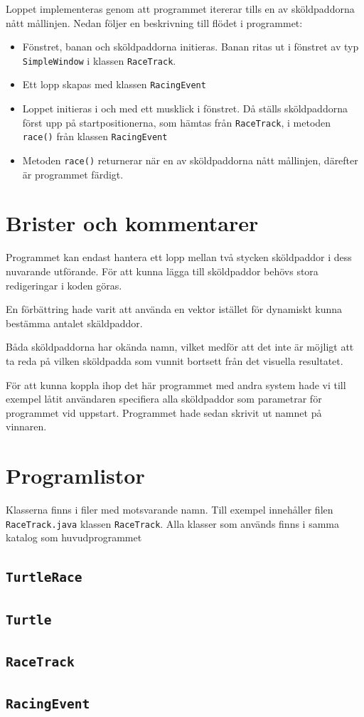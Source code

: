 \documentclass[a4paper]{article}
\newcommand{\code}[1]{\texttt{#1}} %
\begin{document}
\vspace{\baselineskip}
Loppet implementeras genom att programmet itererar tills en av sköldpaddorna nått mållinjen.
Nedan följer en beskrivning till flödet i programmet:

\begin{itemize}
\item Fönstret, banan och sköldpaddorna initieras. Banan ritas ut i fönstret av typ \code{SimpleWindow} i klassen \code{RaceTrack}.
\item Ett lopp skapas med klassen \code{RacingEvent}
\item Loppet initieras i och med ett musklick i fönstret. Då ställs sköldpaddorna först upp på startpositionerna, som hämtas från \code{RaceTrack},  i metoden \code{race()} från klassen \code{RacingEvent}
\item Metoden \code{race()} returnerar när en av sköldpaddorna nått mållinjen, därefter är programmet färdigt. 
\end{itemize}

\section{Brister och kommentarer}
Programmet kan endast hantera ett lopp mellan två stycken sköldpaddor i dess nuvarande utförande. För att kunna lägga till sköldpaddor behövs stora redigeringar i koden göras.

En förbättring hade varit att använda en vektor istället för dynamiskt kunna bestämma antalet skäldpaddor.

Båda sköldpaddorna har okända namn, vilket medför att det inte är möjligt att ta reda på vilken sköldpadda som vunnit bortsett från det visuella resultatet. 

För att kunna koppla ihop det här programmet med andra system hade vi till exempel låtit användaren specifiera alla sköldpaddor som parametrar för programmet vid uppstart. Programmet hade sedan skrivit ut namnet på vinnaren.


\section{Programlistor}
Klasserna finns i filer med motsvarande namn. Till exempel innehåller filen  \code{RaceTrack.java} klassen \code{RaceTrack}. Alla klasser som används finns i samma katalog som huvudprogrammet

\subsection{\code{TurtleRace}}


\subsection{\code{Turtle}}

\subsection{\code{RaceTrack}}

\subsection{\code{RacingEvent}}
\end{document}
